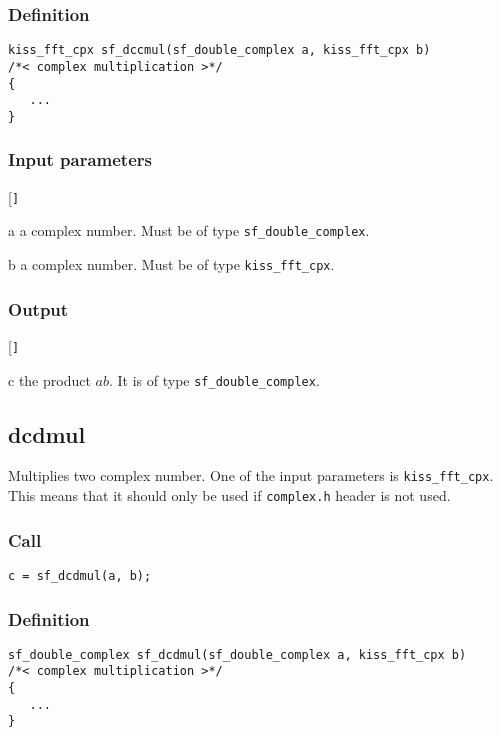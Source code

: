 \subsubsection*{Definition}
\begin{verbatim}
kiss_fft_cpx sf_dccmul(sf_double_complex a, kiss_fft_cpx b)
/*< complex multiplication >*/
{
   ...
}
\end{verbatim}

\subsubsection*{Input parameters}
\begin{desclist}{\tt }{\quad}[\tt ]
   \setlength\itemsep{0pt}
   \item[a] a complex number. Must be of type \texttt{sf\_double\_complex}.  
   \item[b] a complex number. Must be of type \texttt{kiss\_fft\_cpx}.
\end{desclist}

\subsubsection*{Output}
\begin{desclist}{\tt }{\quad}[\tt ]
   \setlength\itemsep{0pt}
   \item[c] the product $ab$. It is of type \texttt{sf\_double\_complex}.
\end{desclist}




\subsection{{dcdmul}}
Multiplies two complex number. One of the input parameters is \texttt{kiss\_fft\_cpx}. This means that it should only be used if \texttt{complex.h} header is not used.

\subsubsection*{Call}
\begin{verbatim}c = sf_dcdmul(a, b);\end{verbatim}

\subsubsection*{Definition}
\begin{verbatim}
sf_double_complex sf_dcdmul(sf_double_complex a, kiss_fft_cpx b)
/*< complex multiplication >*/
{
   ...
}
\end{verbatim}

